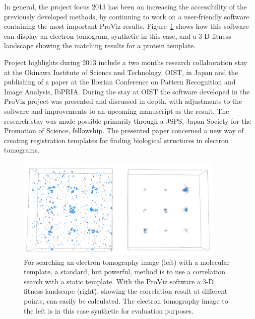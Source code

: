 \begin{enumerate}
{In general, the project focus 2013 has been on increasing the accessibility of the previously developed methods, by continuing to work on a user-friendly software containing the most important ProViz results. Figure~\ref{fig::proviz} shows how this software can display an electron tomogram, synthetic in this case, and a 3-D fitness landscape showing the matching results for a protein template.

Project highlights during 2013 include a two months research collaboration stay at the Okinawa Institute of Science and Technology, OIST, in Japan and the publishing of a paper at the Iberian Conference on Pattern Recognition and Image Analysis, IbPRIA. During the stay at OIST the software developed in the ProViz project was presented and discussed in depth, with adjustments to the software and improvements to an upcoming manuscript as the result. The research stay was made possible primarily through a JSPS, Japan Society for the Promotion of Science, fellowship. The presented paper concerned a new way of creating registration templates for finding biological structures in electron tomograms.}

\begin{figure}[!htbp]
\centering
\includegraphics[width=0.9\textwidth]{figures/research/proviz_search_and_score_volumes.PNG}
\caption{For searching an electron tomography image (left) with a molecular template, a standard, but powerful, method is to use a correlation search with a static template. With the ProViz software a 3-D fitness landscape (right), showing the correlation result at different points, can easily be calculated. The electron tomography image to the left is in this case synthetic for evaluation purposes.}
\label{fig::proviz}
\end{figure}


\end{enumerate}
